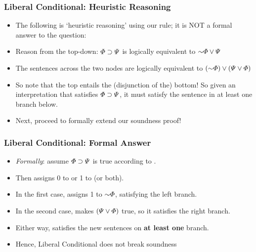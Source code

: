\begin{frame}
\frametitle{Liberal Conditional: Heuristic Reasoning}

\begin{itemize}[<+->]

\item The following is `heuristic reasoning' using our rule; it is NOT a formal answer to the question:

\item Reason from the top-down: $\varPhi{}\supset\varPsi{}$ is logically equivalent to $\enot \metaA{}\eor  \metaB{}$ 

\item The sentences across the two nodes are logically equivalent to $(\enot \metaA{}) \eor (\metaB{} \eor \metaA{})$

\item So note that the top entails the (disjunction of the) bottom! So given an interpretation that satisfies  $\varPhi{}\supset\varPsi{}$, it must satisfy the sentence in at least one branch below. 

\item Next, proceed to formally extend our soundness proof!



\end{itemize}
\end{frame}

\begin{frame}
\frametitle{Liberal Conditional: Formal Answer}

\begin{itemize}[<+->]

\item \emph{Formally}: assume $\varPhi{}\supset\varPsi{}$ is true according to . 

\item Then  assigns 0 to \metaA{} or 1 to \metaB{} (or both). 

\item In the first case,  assigns 1 to $\enot \metaA{}$, satisfying the left branch. 

\item In the second case,  makes $(\varPsi{} \vee \varPhi{})$ true, so it satisfies the right branch. 

\item Either way,  satisfies the new sentences on \textbf{\textcolor{OGlyallpink}{at least one}} branch. 

\item Hence, Liberal Conditional does not break soundness 





\end{itemize}
\end{frame}


